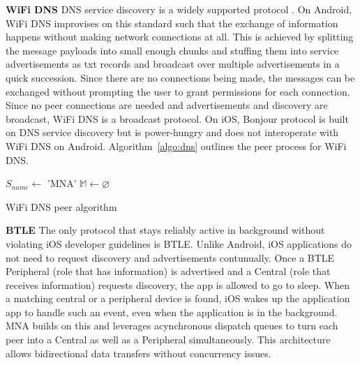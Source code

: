 \documentclass[conference]{IEEEtran}
\begin{document}
\noindent\textbf{WiFi DNS} DNS service discovery is a widely supported
protocol \cite{cheshire-dns-sd-2013}. On Android, WiFi DNS improvises
on this standard such that the exchange of information happens without
making network connections at all. This is achieved by splitting the
message payloads into small enough chunks and stuffing them into
service advertisements as txt records and broadcast over multiple
advertisements in a quick succession. Since there are no connections
being made, the messages can be exchanged without prompting the user
to grant permissions for each connection. Since no peer connections
are needed and advertisements and discovery are broadcast, WiFi DNS is
a broadcast protocol. On iOS, Bonjour protocol is built on DNS service
discovery but is power-hungry and does not interoperate with WiFi DNS
on Android. Algorithm~\ref{algo:dns} outlines the peer process for
WiFi DNS.

\begin{algorithm}[h]
\label{algo:dns}
\DontPrintSemicolon %
\SetAlgoLined
{}
 $S_{name} \gets$ \textsf{'MNA'}\;
 $\mathbb{M} \gets \varnothing$\;
 \caption{WiFi DNS peer algorithm}
\end{algorithm}

\noindent\textbf{BTLE} The only protocol that stays reliably active in
background without violating iOS developer guidelines is BTLE. Unlike
Android, iOS applications do not need to request discovery and
advertisements contunually. Once a BTLE Peripheral (role that has
information) is advertised and a Central (role that receives
information) requests discovery, the app is allowed to go to
sleep. When a matching central or a peripheral device is found, iOS
wakes up the application app to handle such an event, even when the
application is in the background. MNA builds on this and leverages
acynchronous dispatch queues to turn each peer into a Central as well
as a Peripheral simultaneously. This architecture allows bidirectional
data transfers without concurrency issues.
%
\end{document}
